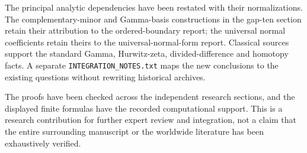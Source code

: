 \documentclass[11pt,a4paper]{article}
\theoremstyle{definition}
\theoremstyle{remark}
\numberwithin{equation}{section}
\newcommand{\file}[1]{\nolinkurl{#1}}
\begin{document}
The principal analytic dependencies have been restated with their
normalizations. The complementary-minor and Gamma-basis constructions
in the gap-ten section retain their attribution to the ordered-boundary
report; the universal normal coefficients retain theirs to the
universal-normal-form report. Classical sources support the standard
Gamma, Hurwitz-zeta, divided-difference and homotopy facts. A separate
\file{INTEGRATION_NOTES.txt} maps the new conclusions to the existing
questions without rewriting historical archives.

The proofs have been checked across the independent research sections,
and the displayed finite formulas have the recorded computational
support. This is a research contribution for further expert review
and integration, not a claim that the entire surrounding manuscript
or the worldwide literature has been exhaustively verified.
\end{document}
